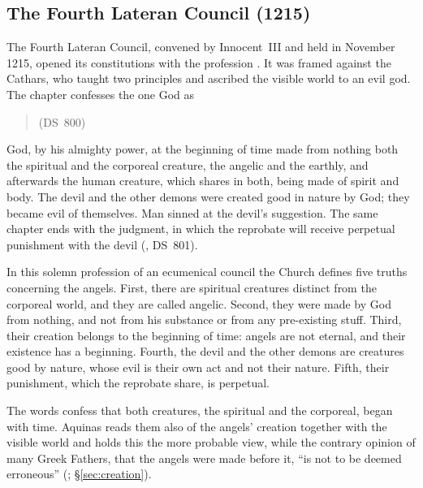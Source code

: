 \sectionguard
\subsection{The Fourth Lateran Council (1215)}

The Fourth Lateran Council, convened by Innocent~III and held in November
1215, opened its constitutions with the profession . It was framed against the Cathars, who taught two principles and
ascribed the visible world to an evil god. The chapter confesses the one God
as
\begin{quote}
 (DS~800)
\end{quote}
God, by his almighty power, at the beginning of time made from nothing both
the spiritual and the corporeal creature, the angelic and the earthly, and
afterwards the human creature, which shares in both, being made of spirit
and body. The devil and the other demons were created good in nature by
God; they became evil of themselves. Man sinned at the devil's suggestion.
The same chapter ends with the judgment, in which the reprobate will receive
perpetual punishment with the devil (, DS~801).

In this solemn profession of an ecumenical council the Church defines five
truths concerning the angels. First, there are spiritual creatures distinct from the corporeal world,
and they are called angelic. Second, they were made by God from nothing,
and not from his substance or from any pre-existing stuff. Third, their
creation belongs to the beginning of time: angels are not eternal, and
their existence has a beginning. Fourth, the devil and the other demons are
creatures good by nature, whose evil is their own act and not their
nature. Fifth, their punishment, which the reprobate share, is perpetual.

The words  confess that both creatures, the
spiritual and the corporeal, began with time. Aquinas reads them also of
the angels' creation together with the visible world and holds this the
more probable view, while the contrary opinion of many Greek Fathers, that
the angels were made before it, ``is not to be deemed erroneous'' (; \S\ref{sec:creation}).

